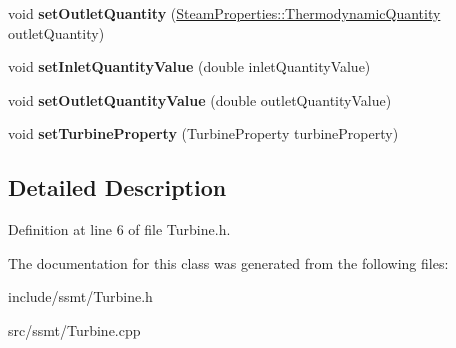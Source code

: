 \begin{DoxyCompactItemize}
void {\bfseries set\+Outlet\+Quantity} (\hyperlink{class_steam_properties_ae0294bedf7d178c2d8fb6aed0f62fbff}{Steam\+Properties\+::\+Thermodynamic\+Quantity} outlet\+Quantity)
\item 
\mbox{\label{class_turbine_ac01a053462c83e21ecc2158e75477542}} 
void {\bfseries set\+Inlet\+Quantity\+Value} (double inlet\+Quantity\+Value)
\item 
\mbox{\label{class_turbine_ab37326068f633280de8f8144b9c8eb89}} 
void {\bfseries set\+Outlet\+Quantity\+Value} (double outlet\+Quantity\+Value)
\item 
\mbox{\label{class_turbine_abb3f16cefe52f4e9c7b32b2bb17a68ee}} 
void {\bfseries set\+Turbine\+Property} (Turbine\+Property turbine\+Property)
\end{DoxyCompactItemize}


\subsection{Detailed Description}


Definition at line 6 of file Turbine.\+h.



The documentation for this class was generated from the following files\+:\begin{DoxyCompactItemize}
\item 
include/ssmt/Turbine.\+h\item 
src/ssmt/Turbine.\+cpp\end{DoxyCompactItemize}
